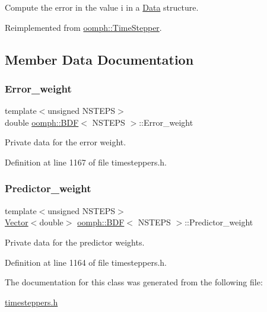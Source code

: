 Compute the error in the value i in a \hyperlink{classoomph_1_1Data}{Data} structure. 



Reimplemented from \hyperlink{classoomph_1_1TimeStepper_a27f66759f6d9b2040d26918adb998c78}{oomph\+::\+Time\+Stepper}.



\subsection{Member Data Documentation}
\mbox{\label{classoomph_1_1BDF_a64fe5c2a1e2872698dd72033d9f0087f}} 
\subsubsection{\texorpdfstring{Error\+\_\+weight}{Error\_weight}}
{\footnotesize\ttfamily template$<$unsigned N\+S\+T\+E\+PS$>$ \\
double \hyperlink{classoomph_1_1BDF}{oomph\+::\+B\+DF}$<$ N\+S\+T\+E\+PS $>$\+::Error\+\_\+weight\hspace{0.3cm}{\ttfamily [private]}}



Private data for the error weight. 



Definition at line 1167 of file timesteppers.\+h.

\mbox{\label{classoomph_1_1BDF_a8973b856c5829681fd890323e43e03ae}} 
\subsubsection{\texorpdfstring{Predictor\+\_\+weight}{Predictor\_weight}}
{\footnotesize\ttfamily template$<$unsigned N\+S\+T\+E\+PS$>$ \\
\hyperlink{classoomph_1_1Vector}{Vector}$<$double$>$ \hyperlink{classoomph_1_1BDF}{oomph\+::\+B\+DF}$<$ N\+S\+T\+E\+PS $>$\+::Predictor\+\_\+weight\hspace{0.3cm}{\ttfamily [private]}}



Private data for the predictor weights. 



Definition at line 1164 of file timesteppers.\+h.



The documentation for this class was generated from the following file\+:\begin{DoxyCompactItemize}
\item 
\hyperlink{timesteppers_8h}{timesteppers.\+h}\end{DoxyCompactItemize}
